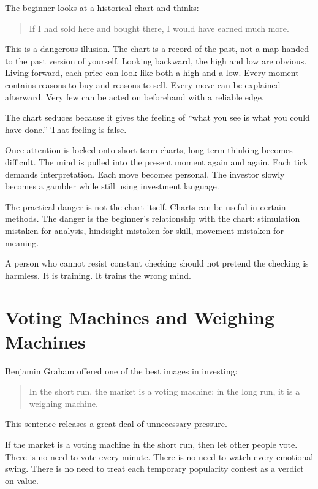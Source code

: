 The beginner looks at a historical chart and thinks:

\begin{quote}
If I had sold here and bought there, I would have earned much more.
\end{quote}

This is a dangerous illusion. The chart is a record of the past, not a map handed to the past version of yourself. Looking backward, the high and low are obvious. Living forward, each price can look like both a high and a low. Every moment contains reasons to buy and reasons to sell. Every move can be explained afterward. Very few can be acted on beforehand with a reliable edge.

The chart seduces because it gives the feeling of ``what you see is what you could have done.'' That feeling is false.

Once attention is locked onto short-term charts, long-term thinking becomes difficult. The mind is pulled into the present moment again and again. Each tick demands interpretation. Each move becomes personal. The investor slowly becomes a gambler while still using investment language.

The practical danger is not the chart itself. Charts can be useful in certain methods. The danger is the beginner's relationship with the chart: stimulation mistaken for analysis, hindsight mistaken for skill, movement mistaken for meaning.

A person who cannot resist constant checking should not pretend the checking is harmless. It is training. It trains the wrong mind.

\section*{Voting Machines and Weighing Machines}

Benjamin Graham offered one of the best images in investing:

\begin{quote}
In the short run, the market is a voting machine; in the long run, it is a weighing machine.
\end{quote}

This sentence releases a great deal of unnecessary pressure.

If the market is a voting machine in the short run, then let other people vote. There is no need to vote every minute. There is no need to watch every emotional swing. There is no need to treat each temporary popularity contest as a verdict on value.

